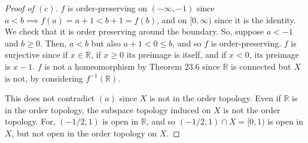 \documentclass[12pt]{article}
\theoremstyle{remark}
\begin{document}
\begin{proof}[Proof of $(c)$]
  $f$ is order-preserving on $(-\infty,-1)$ since $a < b \implies f(a) = a+1 < b+1 = f(b)$, and on $[0,\infty)$ since it is the identity. We check that it is order preserving around the boundary. So, suppose $a < -1$ and $b \ge 0$. Then, $a < b$ but also $a+1 < 0 \le b$, and so $f$ is order-preserving. $f$ is surjective since if $x \in \mathbb{R}$, if $x \ge 0$ its preimage is itself, and if $x < 0$, its preimage is $x-1$. $f$ is not a homeomorphism by Theorem $23.6$ since $\mathbb{R}$ is connected but $X$ is not, by considering $f^{-1}(\mathbb{R})$.
  \par This does not contradict $(a)$ since $X$ is not in the order topology. Even if $\mathbb{R}$ is in the order topology, the subspace topology induced on $X$ is not the order topology. For, $(-1/2,1)$ is open in $\mathbb{R}$, and so $(-1/2,1) \cap X = [0,1)$ is open in $X$, but not open in the order topology on $X$.
\end{proof}
\end{document}
